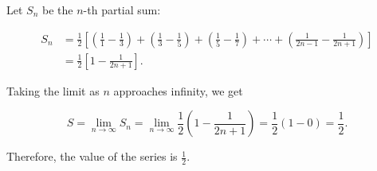 Let \(S_n\) be the \(n\)-th partial sum:

\begin{align*}
    S_n &= \frac{1}{2} \left[ \left( \frac{1}{1} - \frac{1}{3} \right) + \left( \frac{1}{3} - \frac{1}{5} \right) + \left( \frac{1}{5} - \frac{1}{7} \right) + \cdots + \left( \frac{1}{2n - 1} - \frac{1}{2n + 1} \right) \right] \\
    &= \frac{1}{2} \left[ 1 - \frac{1}{2n + 1} \right].
\end{align*}

Taking the limit as \(n\) approaches infinity, we get

\[
    S = \lim_{n \to \infty} S_n = \lim_{n \to \infty} \frac{1}{2} \left( 1 - \frac{1}{2n + 1} \right) = \frac{1}{2} (1 - 0) = \frac{1}{2}.
\]

Therefore, the value of the series is \(\frac{1}{2}\).
